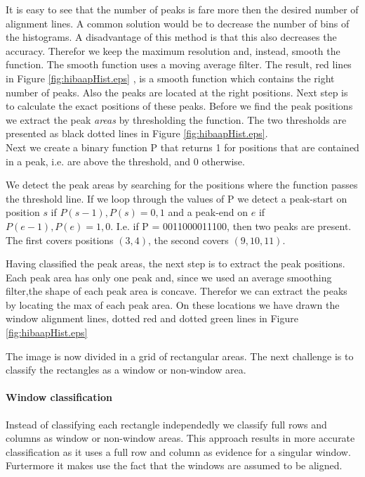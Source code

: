It is easy to see that the number of peaks is fare more then the desired number of alignment lines.
A common solution would be to decrease the number of bins of the histograms. A
disadvantage of this method is that this also decreases the accuracy. Therefor
we keep the maximum resolution and, instead, smooth the function. The smooth
function uses a moving average filter.
The result, red lines in Figure \ref{fig:hibaapHist.eps}
, is a smooth function which contains the right number of peaks. Also the peaks
are located at the right positions. Next step is to calculate the exact positions of these peaks.
Before we find the peak positions we extract the peak \emph{areas} by thresholding the
function. The two thresholds are presented as black dotted lines in Figure \ref{fig:hibaapHist.eps}.\\
Next we create a binary function P that returns 1 for positions that are contained in
a peak, i.e. are above the threshold, and 0 otherwise.

We detect the peak areas by searching for the positions where the function
passes the threshold line. 
If we loop through the values of P we detect a peak-start on position $s$ if ${P(s-1),P(s)}={0,1}$
and a peak-end on $e$ if ${P(e-1),P(e)}={1,0}$. 
I.e. if P = 0011000011100, then two peaks are present. The first covers positions $(3,4)$, 
the second covers $(9,10,11)$. 

Having classified the peak areas, the next step is to extract the peak positions. 
Each peak area has only one peak and, since we used an average smoothing filter,the shape of each  
peak area is concave. Therefor we can extract the peaks
by locating the max of each peak area. 
On these locations we have drawn the window alignment lines, dotted red and dotted green lines
in Figure \ref{fig:hibaapHist.eps}

The image is now divided in a grid of rectangular areas. The next challenge is to 
classify the rectangles as a window or non-window area.

\paragraph{Window classification}
Instead of classifying each rectangle independedly we classify full rows and
columns as window or non-window areas.  This approach results in more accurate
classification as it uses a full row and column as evidence for a singular
window. Furtermore it makes use the fact that the windows are assumed to be
aligned.

